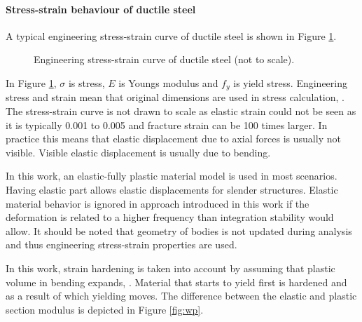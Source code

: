 \documentclass{jcgt}
\begin{document}
\paragraph{Stress-strain behaviour of ductile steel}
A typical engineering stress-strain curve of ductile steel is shown in Figure \ref{fig:sscurve}.


\begin{figure}
\centering
{}
\caption{Engineering stress-strain curve of ductile steel (not to scale).}
\label{fig:sscurve}
\end{figure}

In Figure \ref{fig:sscurve}, $\sigma$ is stress, $E$ is Youngs modulus and $f_y$ is yield stress.
Engineering stress and strain mean that original dimensions are used in stress calculation,
\cite{dowling}.
The stress-strain curve is not drawn to scale as elastic strain could not be seen as it is typically 
0.001 to 0.005 and fracture strain can be 100 times larger.
In practice this means that elastic displacement due to axial forces is usually not visible.
Visible elastic displacement is usually due to bending.

In this work, an elastic-fully plastic material model is used in most scenarios.
Having elastic part allows elastic displacements for slender structures. 
Elastic material behavior is ignored in approach introduced in this work if
the deformation is related to a higher frequency
than integration stability would allow.
It should be noted that geometry
of bodies is not updated during analysis and thus engineering stress-strain properties are used.

In this work, strain hardening is taken into account by assuming that plastic volume in bending
expands, 
\cite{dowling}.
Material that starts to yield first is hardened and as a result of which yielding moves.
%
The difference between the elastic and plastic section modulus is depicted in Figure \ref{fig:wp}.
\end{document}
